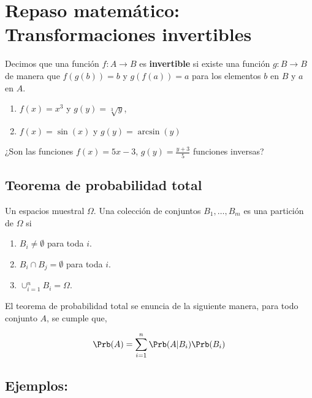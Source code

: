 \documentclass{assignment}
\begin{document}
\maketitle
\tableofcontents
\newpage

\section{Repaso matemático: Transformaciones invertibles}
Decimos que una función $f: A \to B$ es \textbf{invertible} si existe una función $g:B \to B$ de manera que $f(g(b))=b$ y $g(f(a))=a$ para los elementos $b$ en $B$ y $a$ en $A$. 

\begin{enumerate}
    \item $f(x)=x^3$ y $g(y)= \sqrt[3]{y}$,
    \item $f(x)= \sin(x)$ y $g(y)= \arcsin(y)$
\end{enumerate}

¿Son las funciones $f(x)=5x-3$, $g(y)=\frac{y+3}{5}$ funciones inversas?


\subsection*{Teorema de probabilidad total}
Un espacios muestral $\Omega$. Una colección de conjuntos $B_1, \dots , B_m$ es una partición de $\Omega$ si 
\begin{enumerate}
	\item $B_i\neq \emptyset$ para toda $i.$
	\item $B_i \cap B_j = \emptyset$ para toda $i.$
	\item $\cup_{i=1}^n B_i = \Omega$.
\end{enumerate}

El teorema de probabilidad total se enuncia de la siguiente manera, para todo conjunto $A$, se cumple que,

\[
\Prb(A)=\sum_{i=1}^n \Prb(A|B_i) \Prb(B_i)
\]

\subsection*{Ejemplos:}
 
\end{document}

